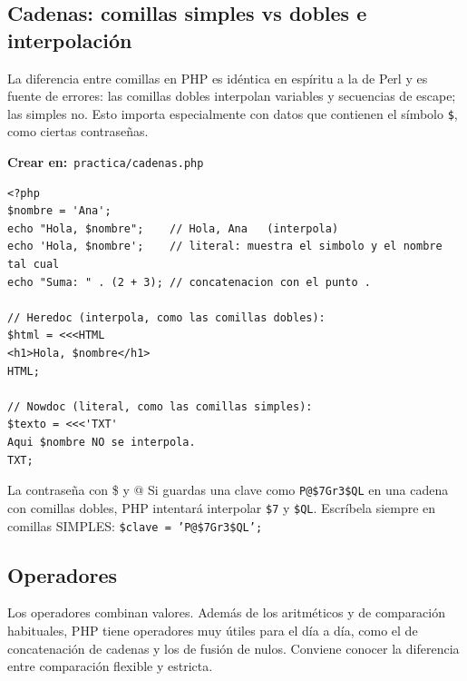 \documentclass[11pt]{article}
\begin{document}
\subsection{Cadenas: comillas simples vs dobles e interpolación}
La diferencia entre comillas en PHP es idéntica en espíritu a la de Perl y es fuente de errores: las comillas dobles interpolan variables y secuencias de escape; las simples no. Esto importa especialmente con datos que contienen el símbolo \texttt{\$}, como ciertas contraseñas.

{\small\color{phpazulo}\textbf{Crear en:}~}\texttt{practica/\allowbreak{}cadenas.\allowbreak{}php}\par\nobreak\vspace{-1pt}
\begin{cajacodigo}
\begin{lstlisting}[style=php]
<?php
$nombre = 'Ana';
echo "Hola, $nombre";    // Hola, Ana   (interpola)
echo 'Hola, $nombre';    // literal: muestra el simbolo y el nombre tal cual
echo "Suma: " . (2 + 3); // concatenacion con el punto .

// Heredoc (interpola, como las comillas dobles):
$html = <<<HTML
<h1>Hola, $nombre</h1>
HTML;

// Nowdoc (literal, como las comillas simples):
$texto = <<<'TXT'
Aqui $nombre NO se interpola.
TXT;
\end{lstlisting}
\end{cajacodigo}
\vspace{2pt}
\begin{cajawarn}{La contraseña con \$ y @}
Si guardas una clave como \texttt{P@\$7Gr3\$QL} en una cadena con comillas dobles, PHP intentará interpolar \texttt{\$7} y \texttt{\$QL}. Escríbela siempre en comillas SIMPLES: \texttt{\$clave =\allowbreak{} 'P@\$7Gr3\$QL';\allowbreak{}}\par
\end{cajawarn}
\subsection{Operadores}
Los operadores combinan valores. Además de los aritméticos y de comparación habituales, PHP tiene operadores muy útiles para el día a día, como el de concatenación de cadenas y los de fusión de nulos. Conviene conocer la diferencia entre comparación flexible y estricta.
\end{document}
